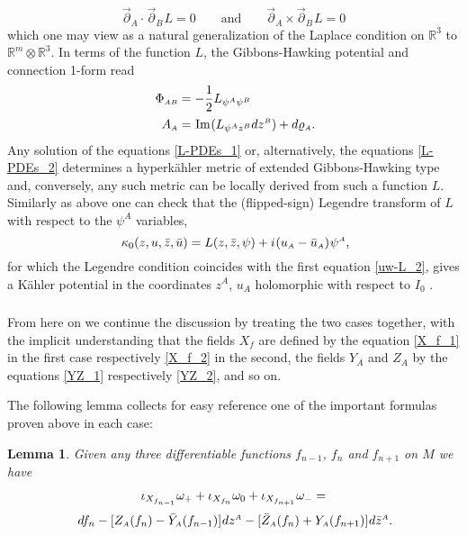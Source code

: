 \documentclass[11pt]{amsart}
\newtheorem{lemma}[theorem]{Lemma}
\theoremstyle{remark}
\theoremstyle{remark}
\theoremstyle{definition}
\theoremstyle{definition}
\theoremstyle{definition}
\newcommand{\0}{{\scriptstyle 0'}} %
\newcommand{\1}{{\scriptstyle 1'}}
\newcommand{\A}{{\scriptscriptstyle A}} %
\newcommand{\B}{{\scriptscriptstyle B}}
\newcommand{\pt}{\hspace{1pt}} %
\newcommand{\hp}{\hspace{0.5pt}} %
\renewcommand{\Im }{\hp\mbox{Im}\hp}
\begin{document}
\begin{equation} \label{L-PDEs_2}
\vec{\partial}_{\A} \cdot \pt \vec{\partial}_{\B} \pt L = 0 
\qquad \text{and} \qquad 
\vec{\partial}_{\A} \times \vec{\partial}_{\B} \pt L = 0 
\end{equation}
which one may view as a natural generalization of the Laplace condition on $\mathbb{R}^3$ to $\mathbb{R}^m \otimes \mathbb{R}^{3}$. In terms of the function $L$, the Gibbons-Hawking potential and connection 1-form read
\begin{equation} \label{LT_eqs}
\begin{aligned}
\Phi_{\A\B} & = - \frac{1}{2} L_{\psi^{\A}\psi^{\B}} \\[1pt]
A_{\A} & = \Im (L_{\psi^{A}z^{B}}dz^{\B}) + d\varrho_{\A} \rlap{.}
\end{aligned}
\end{equation}
Any solution of the equations \eqref{L-PDEs_1} or, alternatively, the equations \eqref{L-PDEs_2} determines a hyperk\"ahler metric of extended Gibbons-Hawking type and, conversely, any such metric can be locally derived from such a function $L$. Similarly as above one can check that the (flipped-sign) Legendre transform of $L$ with respect to the $\psi^{\A}$ variables, 
\begin{equation}
\kappa_0(z,u,\bar{z},\bar{u}) = L(z,\bar{z},\psi) + i \hp (u_{\A} - \bar{u}_{\A}) \hp \psi^{\A} \rlap{,}
\end{equation}
for which the Legendre condition coincides with the first equation \eqref{uw-L_2}, gives a K\"ahler potential in the coordinates $z^{\A}$, $u_{\A}$ holomorphic with respect to $I_0$ \cite{MR877637}.


\subsubsection{}


From here on we continue the discussion by treating the two cases together, with the implicit understanding that the fields $X_f$ are defined by the equation \eqref{X_f_1} in the first case respectively \eqref{X_f_2} in the second, the fields $Y_{\A}$ and $Z_{\A}$ by the equations \eqref{YZ_1} respectively \eqref{YZ_2}, and so on. 

The following lemma collects for easy reference one of the important formulas proven above in each case: 

\begin{lemma} \label{tri-sym-formula}
Given any three differentiable functions $f_{n-1}$, $f_n$ and $f_{n+1}$ on $M$ we have
\begin{gather} 
\iota_{X_{f_{n-1}}}\omega_+ + \iota_{X_{f_n}}\omega_0 + \iota_{X_{f_{n+1}}}\omega_- =  \\[2pt]
df_n - [Z_{\A}(f_n) - \bar{Y}_{\A}(f_{n-1})] \hp dz^{\A} - [\bar{Z}_{\A}(f_n) + Y_{\A}(f_{n+1})] \hp d\bar{z}^{\A} \rlap{.} \nonumber
\end{gather}
\end{lemma}
\end{document}
